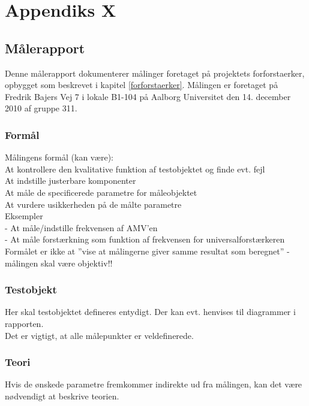

\chapter{Appendiks X}
\label{maaleforforstaerker}
\section*{Målerapport}
Denne målerapport dokumenterer målinger foretaget på projektets forforstaerker, opbygget som beskrevet i kapitel \ref{forforstaerker}. Målingen er foretaget på Fredrik Bajers Vej 7 i lokale B1-104 på Aalborg Universitet den 14. december 2010 af gruppe 311.

\subsection*{Formål}
\label{maaleforforstaerker_formaal}
Målingens formål (kan være):\\
At kontrollere den kvalitative funktion af testobjektet og finde evt. fejl\\
At indstille justerbare komponenter \\
At måle de specificerede parametre for måleobjektet \\
At vurdere usikkerheden på de målte parametre\\
Eksempler \\
- At måle/indstille frekvensen af AMV’en\\
- At måle forstærkning som funktion af frekvensen for universalforstærkeren\\
Formålet er ikke at ”vise at målingerne giver samme resultat som beregnet” - målingen skal være objektiv!!\\

\subsection*{Testobjekt}
\label{maaleforforstaerker_testobjekt}
Her skal testobjektet defineres entydigt. Der kan evt. henvises til diagrammer i rapporten.\\
Det er vigtigt, at alle målepunkter er veldefinerede.\\

\subsection*{Teori}
\label{maaleforforstaerker_teori}
Hvis de ønskede parametre fremkommer indirekte ud fra målingen, kan det være nødvendigt at beskrive teorien.\\

